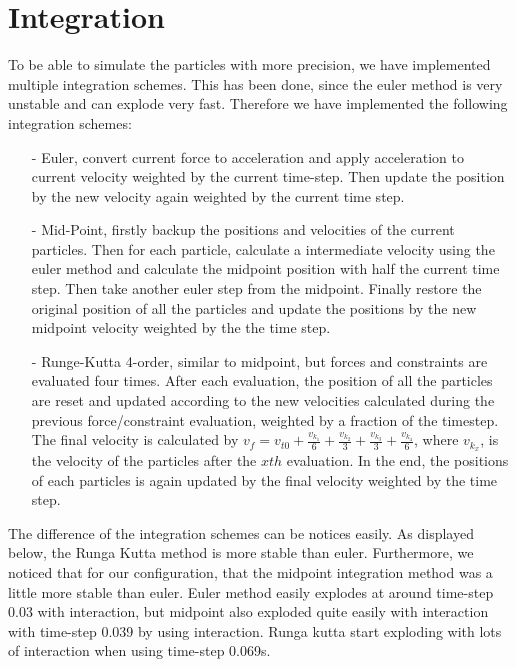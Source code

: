 \section{Integration}
To be able to simulate the particles with more precision, we have implemented multiple integration schemes. This has been done, since the euler method is very unstable and can explode very fast. Therefore we have implemented the following integration schemes:
\begin{itemize}
  \item[-] Euler, convert current force to acceleration and apply acceleration to current velocity weighted by the current time-step. Then update the position by the new velocity again weighted by the current time step.
  \item[-] Mid-Point, firstly backup the positions and velocities of the current particles. Then for each particle, calculate a intermediate velocity using the euler method and calculate the midpoint position with half the current time step. Then take another euler step from the midpoint. Finally restore the original position of all the particles and update the positions by the new midpoint velocity weighted by the the time step.
  \item[-] Runge-Kutta 4-order, similar to midpoint, but forces and constraints are evaluated four times. After each evaluation, the position of all the particles are reset and updated according to the new velocities calculated during the previous force/constraint evaluation, weighted by a fraction of the timestep. The final velocity is calculated by $v_f = v_{t0} + \frac{v_{k_1}}{6} + \frac{v_{k_2}}{3} + \frac{v_{k_3}}{3} + \frac{v_{k_4}}{6}$, where $v_{k_x}$, is the velocity of the particles after the $xth$ evaluation. In the end, the positions of each particles is again updated by the final velocity weighted by the time step.
\end{itemize}
The difference of the integration schemes can be notices easily. As displayed below, the Runga Kutta method is more stable than euler. Furthermore, we noticed that for our configuration, that the midpoint integration method was a little more stable than euler. Euler method easily explodes at around time-step 0.03 with interaction, but midpoint also exploded quite easily with interaction with time-step 0.039 by using interaction. Runga kutta start exploding with lots of interaction when using time-step 0.069s.

